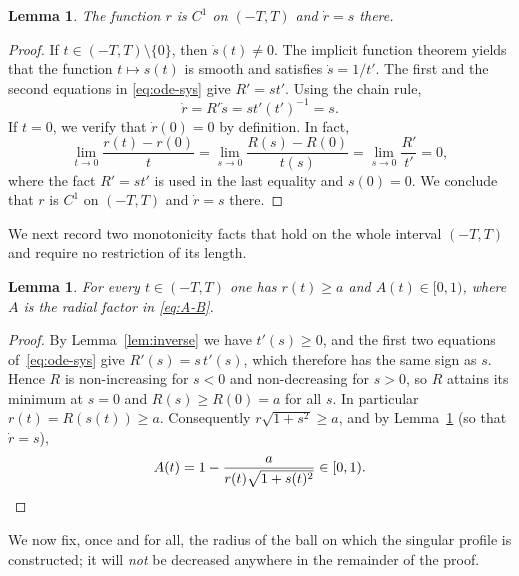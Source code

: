 \documentclass[12pt,letterpaper]{amsart}
\theoremstyle{definition}
\theoremstyle{plain}
\newtheorem{lemma}[definition]{Lemma}
\numberwithin{equation}{section}
\begin{document}
\begin{lemma}\label{lem:C1}
    The function $r$ is $C^1$ on $(-T,T)$ and $\dot{r}=s$ there.
\end{lemma}
\begin{proof}
   If $t\in(-T,T)\setminus\{0\}$, then $\dot{s}(t)\neq 0$. The implicit function theorem yields that the function $t\mapsto s(t)$ is smooth and satisfies $\dot{s}=1/t'$.
   The first and the second equations in \eqref{eq:ode-sys} give $R'=st'$.
  Using the chain rule,
   \[
    \dot{r}=R'\dot{s}=st'(t')^{-1}=s.
   \]
   If $t=0$, we verify that $\dot{r}(0)=0$ by definition. In fact,
   \[
   \lim_{t\to 0}\frac{r(t)-r(0)}{t}=\lim_{s\to 0}\frac{R(s)-R(0)}{t(s)}=\lim_{s\to 0}\frac{R'}{t'}=0,
   \]
   where the fact $R'=st'$ is used in the last equality and $s(0)=0$.
   We conclude that $r$ is $C^1$ on $(-T,T)$ and $\dot{r}=s$ there.
\end{proof}

We next record two monotonicity facts that hold on the whole interval $(-T,T)$ and require no
restriction of its length.

\begin{lemma}\label{lem:Ra}
    For every $t\in(-T,T)$ one has $r(t)\geq a$ and $A(t)\in[0,1)$, where $A$ is the radial
    factor in \eqref{eq:A-B}.
\end{lemma}
\begin{proof}
    By Lemma~\ref{lem:inverse} we have $t'(s)\geq0$, and the first two equations
    of~\eqref{eq:ode-sys} give $R'(s)=s\,t'(s)$, which therefore has the same sign as $s$.
    Hence $R$ is non-increasing for $s<0$ and non-decreasing for $s>0$, so $R$ attains its
    minimum at $s=0$ and $R(s)\geq R(0)=a$ for all $s$. In particular $r(t)=R(s(t))\geq a$.
    Consequently $r\sqrt{1+s^2}\geq a$, and by Lemma~\ref{lem:C1} (so that $\dot r=s$),
    \[
        A(t)=1-\frac{a}{r(t)\sqrt{1+s(t)^2}}\in[0,1).\qedhere
    \]
\end{proof}

We now fix, once and for all, the radius of the ball on which the singular profile is
constructed; it will \emph{not} be decreased anywhere in the remainder of the proof.
\end{document}
